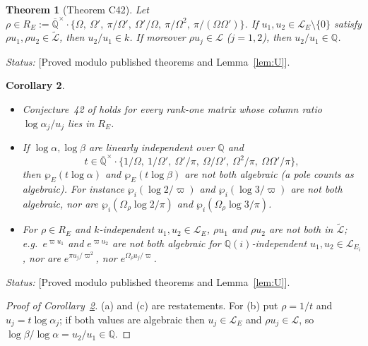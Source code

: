 \documentclass[11pt]{amsart}
\newtheorem{theorem}{Theorem}[section]
\newtheorem{corollary}[theorem]{Corollary}
\theoremstyle{definition}
\newcommand{\Qb}{\overline{\mathbb{Q}}}
\newcommand{\Q}{\mathbb{Q}}
\newcommand{\Lg}{\mathcal{L}}
\newcommand{\Lt}{\widetilde{\mathcal{L}}}
\newcommand{\vp}{\varpi}
\newcommand{\lab}[1]{\textup{[#1]}}
\newcommand{\LabC}{\lab{Proved modulo published theorems and Lemma~\ref{lem:U}}}
\newcommand{\Status}{\noindent\emph{Status:} }
\begin{document}
\begin{theorem}[Theorem C42]\label{thm:C42}
Let $\rho\in R_E:=\Qb^\times\cdot\{\Omega,\ \Omega',\ \pi/\Omega',\ \Omega'/\Omega,\ \pi/\Omega^2,\ \pi/(\Omega\Omega')\}$. If
$u_1,u_2\in\Lg_E\setminus\{0\}$ satisfy $\rho u_1,\rho u_2\in\Lt$, then $u_2/u_1\in k$. If moreover $\rho u_j\in\Lg$ ($j=1,2$),
then $u_2/u_1\in\Q$.
\end{theorem}

\Status \LabC.

\begin{corollary}\label{cor:C42}
\begin{itemize}
\item[(a)] Conjecture~42 of \cite{W06} holds for every rank-one matrix whose column ratio $\log\alpha_j/u_j$ lies in $R_E$.
\item[(b)] If $\log\alpha,\log\beta$ are linearly independent over $\Q$ and
\[
t\in\Qb^\times\cdot\{1/\Omega,\ 1/\Omega',\ \Omega'/\pi,\ \Omega/\Omega',\ \Omega^2/\pi,\ \Omega\Omega'/\pi\},
\]
then $\wp_E(t\log\alpha)$ and $\wp_E(t\log\beta)$ are not both algebraic (a pole counts as algebraic). For instance
$\wp_i(\log2/\vp)$ and $\wp_i(\log3/\vp)$ are not both algebraic, nor are $\wp_i(\Omega_\rho\log2/\pi)$ and $\wp_i(\Omega_\rho\log3/\pi)$.
\item[(c)] For $\rho\in R_E$ and $k$-independent $u_1,u_2\in\Lg_E$, $\rho u_1$ and $\rho u_2$ are not both in $\Lt$; e.g.\
$e^{\vp u_1}$ and $e^{\vp u_2}$ are not both algebraic for $\Q(i)$-independent $u_1,u_2\in\Lg_{E_i}$, nor are
$e^{\pi u_j/\vp^2}$, nor $e^{\Omega_\rho u_j/\vp}$.
\end{itemize}
\end{corollary}

\Status \LabC.

\begin{proof}[Proof of Corollary~\ref{cor:C42}]
(a) and (c) are restatements. For (b) put $\rho=1/t$ and $u_j=t\log\alpha_j$; if both values are algebraic then
$u_j\in\Lg_E$ and $\rho u_j\in\Lg$, so $\log\beta/\log\alpha=u_2/u_1\in\Q$.
\end{proof}
\end{document}
